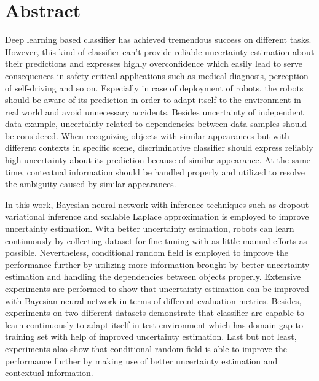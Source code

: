
\thispagestyle{plain}

\section*{Abstract}
Deep learning based classifier has achieved tremendous success on different tasks. However, this kind of classifier can't provide reliable uncertainty estimation about their predictions and expresses highly overconfidence which easily lead to serve consequences in safety-critical applications such as medical diagnosis, perception of self-driving and so on. Especially in case of deployment of robots, the robots should be aware of its prediction in order to adapt itself to the environment in real world and avoid unnecessary accidents. Besides uncertainty of independent data example, uncertainty related to dependencies between data samples should be considered. When recognizing objects with similar appearances but with different contexts in specific scene, discriminative classifier should express reliably high uncertainty about its prediction because of similar appearance. At the same time, contextual information should be handled properly and utilized to resolve the ambiguity caused by similar appearances. 

In this work, Bayesian neural network with inference techniques such as dropout variational inference and scalable Laplace approximation is employed to improve uncertainty estimation. With better uncertainty estimation, robots can learn continuously by collecting dataset for fine-tuning with as little manual efforts as possible. Nevertheless, conditional random field is employed to improve the performance further by utilizing more information brought by better uncertainty estimation and handling the dependencies between objects properly. Extensive experiments are performed to show that uncertainty estimation can be improved with Bayesian neural network in terms of different evaluation metrics. Besides, experiments on two different datasets demonstrate that classifier are capable to learn continuously to adapt itself in test environment which has domain gap to training set with help of improved uncertainty estimation. Last but not least, experiments also show that conditional random field is able to improve the performance further by making use of better uncertainty estimation and contextual information.

\switchlanguage{\lang} %
